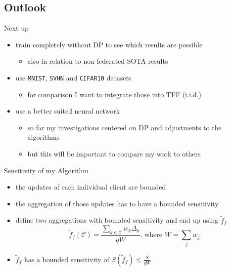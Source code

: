 \documentclass[aspectratio=169]{beamer}
\begin{document}
\subsection{Outlook}

\begin{frame}{Next up}
    \begin{itemize}
        \item train completely without DP to see which results are possible
        \begin{itemize}
            \item also in relation to non-federated SOTA results
        \end{itemize}
        \item \textcite{boenisch:2023} use \texttt{MNIST}, \texttt{SVHN} and \texttt{CIFAR10} datasets
        \begin{itemize}
            \item for comparison I want to integrate those into TFF (i.i.d.)
        \end{itemize}
        \item use a better suited neural network
        \begin{itemize}
            \item so far my investigations centered on DP and adjustments to the algorithms
            \item but this will be important to compare my work to others
        \end{itemize}
    \end{itemize}
\end{frame}

\begin{frame}{Sensitivity of my Algorithm}
    \begin{itemize}
        \item the updates of each individual client are bounded
        \item the aggregation of those updates has to have a bounded sensitivity
        \item \textcite{mcmahan:2018} define two aggregations with bounded sensitivity and end up using $\tilde{f}_f$ 
        $$\tilde{f}_f(\mathcal{C}) = \frac{\sum_{k \in \mathcal{C}} w_k \Delta_k}{qW}\text{, where } W = \sum_{j} w_j$$
        \item $\tilde{f}_f$ has a bounded sensitivity of $S(\tilde{f}_f) \leq \frac{S}{qW}$
    \end{itemize}
\end{frame}
\end{document}
